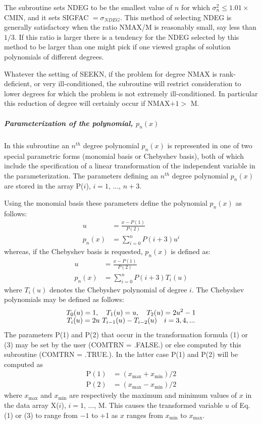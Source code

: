 \documentclass[twoside]{MATH77}
\begin{document}
The subroutine sets NDEG to be the smallest value of $n$ for which $\sigma
^2_n \leq 1.01 \times $CMIN, and it sets SIGFAC $= \sigma _{NDEG}$. This
method of selecting NDEG is generally satisfactory when the ratio NMAX/M is
reasonably small, say less than $1/3$. If this ratio is larger there is a
tendency for the NDEG selected by this method to be larger than one might
pick if one viewed graphs of solution polynomials of different degrees.

Whatever the setting of SEEKN, if the problem for degree NMAX is
rank-deficient, or very ill-conditioned, the subroutine will restrict
consideration to lower degrees for which the problem is not extremely
ill-conditioned. In particular this reduction of degree will certainly occur
if NMAX$+1 > $ M.

\subparagraph{Parameterization of the polynomial, $p_n(x)$}

In this subroutine an $n^{th}$ degree polynomial $p_n(x)$ is represented in
one of two special parametric forms (monomial basis or Chebyshev basis),
both of which include the specification of a linear transformation of the
independent variable in the parameterization. The parameters defining an $%
n^{th}$ degree polynomial $p_n(x)$ are stored in the array P($i$), $i=1$, ...,
$n+3.$

Using the monomial basis these parameters define the polynomial $p_n(x)$ as
follows:
\begin{align}
\label{O1}u&=\frac{x-P(1)}{P(2)}\\
\label{O2}p_n(x)&=\sum_{i=0}^nP(i+3)u^i
\end{align}
whereas, if the Chebyshev basis is requested, $p_n(x)$ is defined as:
\begin{align}
\label{O3}u&=\frac{x-P(1)}{P(2)}\\
\label{O4}p_n(x)&=\sum_{i=0}^nP(i+3)T_i(u)
\end{align}
where $T_i(u)$ denotes the Chebyshev polynomial of degree $i$. The Chebyshev
polynomials may be defined as follows:%
\begin{gather*}
T_0(u)=1,\quad T_1(u)=u,\quad T_2(u)=2u^2-1\vspace{-4pt}\\
T_i(u)=2u\ T_{i-1}(u)-T_{i-2}(u)\quad i=3,4,...
\end{gather*}
The parameters P(1) and P(2) that occur in the transformation formula (1) or
(3) may be set by the user (COMTRN = .FALSE.) or else computed by this
subroutine (COMTRN = .TRUE.). In the latter case P(1) and P(2) will be
computed as\vspace{-2pt}%
\begin{align*}
\text{P}(1)&=(x_{\max }+x_{\min })/2\\
\text{P}(2)&=(x_{\max }-x_{\min })/2
\end{align*}
where $x_{\max }$ and $x_{\min }$ are respectively the maximum and minimum
values of $x$ in the data array X($i$), $i=1$, ..., M. This causes the
transformed variable $u$ of Eq.\,(1) or (3) to range from $-1$ to +1 as $x$
ranges from $x_{\min }$ to $x_{\max }.$
\end{document}
